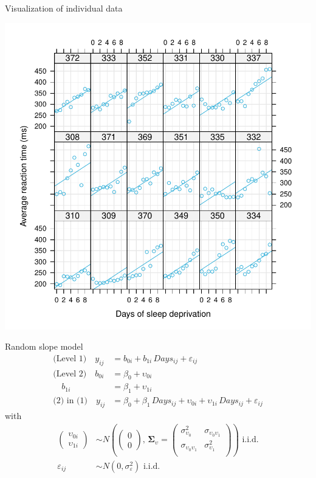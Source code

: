 \documentclass[aspectratio=169]{beamer}
\newcommand{\gmat}[1]{\boldsymbol{#1}}
\begin{document}
\begin{frame}{Visualization of individual data}
  \begin{center}
      \includegraphics[scale=.37]{../figures/sleep_random_intercept}
  \end{center}
\end{frame}


\begin{frame}[fragile]{Random slope model}
\begin{align*}
\text{(Level 1)}  \quad y_{ij} &= b_{0i} + b_{1i}\,Days_{ij} + \varepsilon_{ij}\\
\text{(Level 2)}  \quad b_{0i} &= \beta_0 + \upsilon_{0i}\\
                  \quad b_{1i} &= \beta_1 + \upsilon_{1i}\\
\text{(2) in (1)} \quad y_{ij} &= \beta_0 + \beta_1\,Days_{ij} +
                   \upsilon_{0i} + \upsilon_{1i} \, Days_{ij}+ \varepsilon_{ij}
\end{align*}
with
\begin{align*}
  \begin{pmatrix} \upsilon_{0i}\\ \upsilon_{1i} \end{pmatrix} &\sim
    N \left(\begin{pmatrix} 0\\ 0 \end{pmatrix}, \, \gmat{\Sigma}_\upsilon =
      \begin{pmatrix}
        \sigma^2_{\upsilon_0} & \sigma_{\upsilon_0 \upsilon_1} \\
        \sigma_{\upsilon_0 \upsilon_1} & \sigma^2_{\upsilon_1} \\
      \end{pmatrix} \right)
    \text{ i.i.d.} \\
  \varepsilon_{ij} & \sim N(0, \sigma_{\varepsilon}^2)
    \text{ i.i.d.}
\end{align*}
\end{frame}
\end{document}
